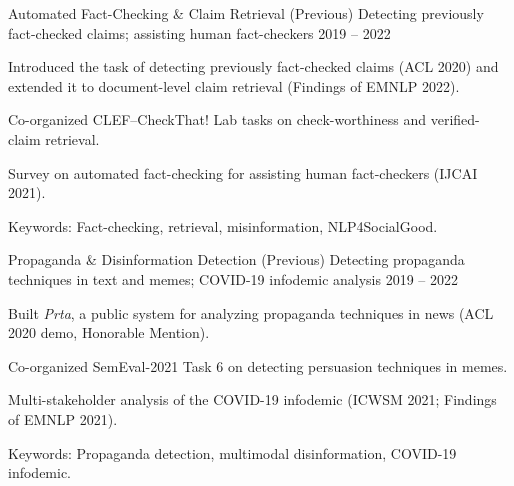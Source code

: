 \begin{cventries}
  \cventry
    {Automated Fact-Checking \& Claim Retrieval (Previous)}
    {Detecting previously fact-checked claims; assisting human fact-checkers}
    {\qcri}
    {2019 -- 2022}
    {
      \begin{cvitems}
        \item Introduced the task of detecting previously fact-checked claims (ACL 2020) and extended it to document-level claim retrieval (Findings of EMNLP 2022).
        \item Co-organized CLEF--CheckThat! Lab tasks on check-worthiness and verified-claim retrieval.
        \item Survey on automated fact-checking for assisting human fact-checkers (IJCAI 2021).
        \item Keywords: Fact-checking, retrieval, misinformation, NLP4SocialGood.
      \end{cvitems}
    }

  \cventry
    {Propaganda \& Disinformation Detection (Previous)}
    {Detecting propaganda techniques in text and memes; COVID-19 infodemic analysis}
    {\qcri}
    {2019 -- 2022}
    {
      \begin{cvitems}
        \item Built \textit{Prta}, a public system for analyzing propaganda techniques in news (ACL 2020 demo, Honorable Mention).
        \item Co-organized SemEval-2021 Task 6 on detecting persuasion techniques in memes.
        \item Multi-stakeholder analysis of the COVID-19 infodemic (ICWSM 2021; Findings of EMNLP 2021).
        \item Keywords: Propaganda detection, multimodal disinformation, COVID-19 infodemic.
      \end{cvitems}
    }

\end{cventries}
